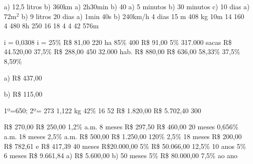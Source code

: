 \begin{respostas}{5}
	\ansitem{} a) 12,5 litros \quad \quad b) 360km
	\ansitem{} a) 2h30min \quad \quad b) 40
	\ansitem{} a) 5 minutos \quad \quad b) 30 minutos \quad \quad c) 10 dias
	\ansitem{} a) 72m$^2$ \quad \quad b) 9 litros
	\ansitem{} 20 dias
	\ansitem{} a) 1min 40s \quad \quad b) 240km/h
	\ansitem{} 4 dias
	\ansitem{} 15 m
	\ansitem{} 408 kg
	\ansitem{} 10m
	\ansitem{} 14
	\ansitem{} 160
	\ansitem{} 4
	\ansitem{} 480
	\ansitem{} 8h
	\ansitem{} 250
	\ansitem{} 16
	\ansitem{} 18
	\ansitem{} 4
	\ansitem{} 4
	\ansitem{} 42
	\ansitem{} 576m
\end{respostas}

\begin{respostas}{6}
    \ansitem{} i = 0,0308
    \ansitem{} i = 25\%
    \ansitem{} R\$ 81,00
    \ansitem{} 220 ha
    \ansitem{} 85\%
    \ansitem{} 400
    \ansitem{} R\$ 91,00
    \ansitem{} 5\%
    \ansitem{} 317.000 sacas
    \ansitem{} R\$ 44.520,00
    \ansitem{} 37,5\%
    \ansitem{} R\$ 288,00
    \ansitem{} 450
    \ansitem{} 32.000 hab.
    \ansitem{} R\$ 880,00
    \ansitem{} R\$ 636,00
    \ansitem{} 58,33\%
    \ansitem{} 37,5\%
    \ansitem{} 8,59\%
    \ansitem{}\begin{multicols}{2}
		a) R\$ 437,00	

		b) R\$ 115,00
	\end{multicols}
	\ansitem{} 1º=650; 2º= 273
    \ansitem{} 1,122 kg
	\ansitem{} 42\%
	\ansitem{} 16
	\ansitem{} 52
	\ansitem{} R\$ 1.820,00
	\ansitem{} R\$ 5.702,40
	\ansitem{} 300
\end{respostas}

\begin{respostas}{7}
    \ansitem{} R\$ 270,00
    \ansitem{} R\$ 250,00
    \ansitem{} 1,2\% a.m.
    \ansitem{} 8 meses
    \ansitem{} R\$ 297,50
    \ansitem{} R\$ 460,00
    \ansitem{} 20 meses
    \ansitem{} 0,656\% a.m.
    \ansitem{} 18 meses
    \ansitem{} 2,5\% a.m. 
    \ansitem{} R\$ 500,00
    \ansitem{} R\$ 1.250,00
    \ansitem{} 120\%
    \ansitem{} 2,5\%
    \ansitem{} 18 meses
    \ansitem{} R\$ 200,00
    \ansitem{} R\$ 782,61 e R\$ 417,39
    \ansitem{} 40 meses
    \ansitem{} R\$20.000,00 
    \ansitem{} 5\%
    \ansitem{} R\$ 50.066,00
    \ansitem{} 12,5\%
    \ansitem{} 10 anos
    \ansitem{} 5\%
    \ansitem{} 6 meses
    \ansitem{} R\$ 9.661,84
    \ansitem{} a) R\$ 5.600,00 \quad \quad b) 50 meses
	\ansitem{} 5\%
	\ansitem{} R\$ 80.000,00
	\ansitem{} 7,5\% ao ano
\end{respostas}
